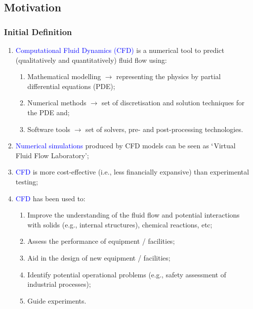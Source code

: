\documentclass[10pt,compress]{beamer}
\begin{document}
\subsection{Motivation}
\begin{frame}
 \frametitle{Initial Definition}

\begin{enumerate}
\item <1->\textcolor{blue}{Computational Fluid Dynamics (CFD)} is a numerical tool to predict (qualitatively and quantitatively) fluid flow using:
\begin{enumerate}
\item <2-> Mathematical modelling $\rightarrow$ representing the physics by partial differential equations (PDE);
\item <3-> Numerical methods $\rightarrow$ set of discretisation and solution techniques for the PDE and;
\item <4-> Software tools $\rightarrow$ set of solvers, pre- and post-processing technologies.
\end{enumerate}
\item <5-> \textcolor{blue}{Numerical simulations} produced by CFD models can be seen as $\lq$Virtual Fluid Flow Laboratory';
\item <6-> \textcolor{blue}{CFD} is more cost-effective (i.e., less financially expansive) than experimental testing;
\item <7-> \textcolor{blue}{CFD} has been used to:
\begin{enumerate}
\item <8-> Improve the understanding of the fluid flow and potential interactions with solids (e.g., internal structures), chemical reactions, etc;
\item <9-> Assess the performance of equipment / facilities;
\item <10-> Aid in the design of new equipment / facilities;
\item <11-> Identify potential operational problems (e.g., safety assessment of industrial processes);
\item <12-> Guide experiments.
\end{enumerate}

\end{enumerate}
 
\end{frame}
\end{document}
